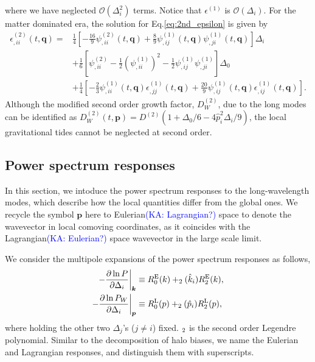 \documentclass[a4paper,11pt]{article}
\let\L\relax
\DeclareMathOperator{\L}{\mathcal{L}}
\newcommand{\vq}{{\bm q}}
\newcommand{\vk}{{\bm k}}
\newcommand{\vp}{{\bm p}}
\newcommand{\Euler}{\mathrm{E}}
\newcommand{\Lagrange}{\mathrm{L}}
\newcommand{\KA}[1]{\textcolor{Blue}{(KA: #1)}}
\begin{document}
where we have neglected $\mathcal{O}(\Delta_i^2)$ terms.
Notice that $\epsilon^{(1)}$ is $\mathcal{O}(\Delta_i)$.
For the matter dominated era,
the solution for Eq.\eqref{eq:2nd_epsilon} is given by
\begin{align}
\epsilon^{(2)}_{,ii}(t, \vq)
=&\frac14 \left[-\frac{16}{9}\psi^{(2)}_{,ii}(t,\vq) + \frac89\psi^{(1)}_{,ij}(t,\vq)\psi^{(1)}_{,ji}(t,\vq) \right]\Delta_i
\nonumber\\
&+\frac16 \left[\psi_{,ii}^{(2)} - \frac12\left( \psi^{(1)}_{,ii}\right)^2- \frac12\psi^{(1)}_{,ij}\psi^{(1)}_{,ji}   \right]\Delta_0
\nonumber\\
&+\frac14\left[-\frac23\psi^{(1)}_{,ii}(t,\vq)\epsilon_{,jj}^{(1)}(t,\vq) + \frac{20}{9}\psi^{(1)}_{,ij}(t,\vq)\epsilon_{,ij}^{(1)}(t,\vq)  \right].
\end{align}
Although the modified second order growth factor, $D^{(2)}_W$, due to the long modes can be identified as $D^{(2)}_W (t, \vp) = D^{(2)}(1 + \Delta_0/6 - 4\hat{p}_i^2\Delta_i/9 )$, the local gravitational tides cannot be neglected at second order.


\subsection{Power spectrum responses}
\label{sub:resp}

In this section, we intoduce the power spectrum responses to the long-wavelength modes,
which describe how the local quantities differ from the global ones.
We recycle the symbol $\vp$ here to Eulerian\KA{Lagrangian?} space to denote the wavevector in
local comoving coordinates, as it coincides with the Lagrangian\KA{Eulerian?}  space
wavevector in the large scale limit.

We consider the multipole expansions of the power spectrum responses as follows,
\begin{align}
    - \frac{\partial\ln P}{\partial\Delta_i} \bigg|_\vk
    &\equiv R^\Euler_0(k) + \L_2(\hat k_i) R^\Euler_2(k), \nonumber\\
    - \frac{\partial\ln P_W}{\partial\Delta_i} \bigg|_\vp
    &\equiv R^\Lagrange_0(p) + \L_2(\hat p_i) R^\Lagrange_2(p),
\end{align}
where holding the other two $\Delta_j$'s ($j \neq i$) fixed.
$\L_2$ is the second order Legendre polynomial.
Similar to the decomposition of halo biases, we name the Eulerian and
Lagrangian responses, and distinguish them with superscripts.
\end{document}
